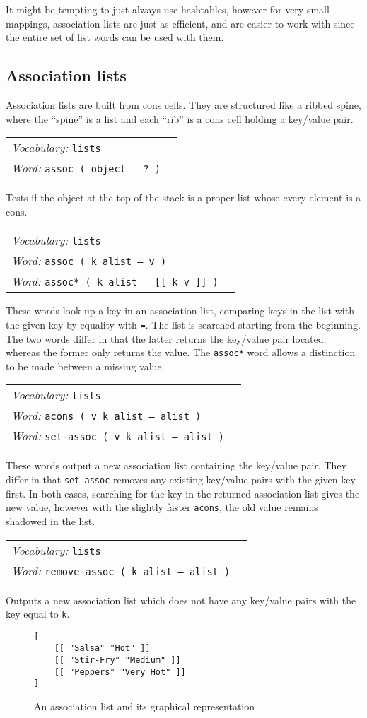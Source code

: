 \documentclass{book}
\newcommand{\vocabulary}[1]{\emph{Vocabulary:} \texttt{#1}&\\}
\newcommand{\ordinaryword}[2]{\index{\texttt{#1}}\emph{Word:} \texttt{#2}&\\}
\newcommand{\wordtable}[1]{


\begin{tabularx}{12cm}{lX}
\hline
#1
\hline
\end{tabularx}

}
\begin{document}
It might be tempting to just always use hashtables, however for very small mappings, association lists are just as efficient, and are easier to work with since the entire set of list words can be used with them.

\subsection{Association lists}


Association lists are built from cons cells. They are structured like a ribbed spine, where the ``spine'' is a list and each ``rib'' is a cons cell holding a key/value pair.

\wordtable{
\vocabulary{lists}
\ordinaryword{assoc?}{assoc ( object -- ?~)}
}
Tests if the object at the top of the stack is a proper list whose every element is a cons.

\wordtable{
\vocabulary{lists}
\ordinaryword{assoc}{assoc ( k alist -- v )}
\ordinaryword{assoc*}{assoc* ( k alist -- [[ k v ]] )}
}
These words look up a key in an association list, comparing keys in the list with the given key by equality with \texttt{=}. The list is searched starting from the beginning. The two words differ in that the latter returns the key/value pair located, whereas the former only returns the value. The \texttt{assoc*} word allows a distinction to be made between a missing value.
\wordtable{
\vocabulary{lists}
\ordinaryword{acons}{acons ( v k alist -- alist )}
\ordinaryword{set-assoc}{set-assoc ( v k alist -- alist )}
}
These words output a new association list containing the key/value pair.
They differ in that \texttt{set-assoc} removes any existing key/value pairs with the given key first. In both cases, searching for the key in the returned association list gives the new value, however with the slightly faster \texttt{acons}, the old value remains shadowed in the list.
\wordtable{
\vocabulary{lists}
\ordinaryword{remove-assoc}{remove-assoc ( k alist -- alist )}

}
Outputs a new association list which does not have any key/value pairs with the key equal to \texttt{k}.

\begin{figure}
\caption{An association list and its graphical representation}
\begin{verbatim}
[
    [[ "Salsa" "Hot" ]]
    [[ "Stir-Fry" "Medium" ]]
    [[ "Peppers" "Very Hot" ]]
]
\end{verbatim}

\begin{center}
\end{center}
\end{figure}
\end{document}
